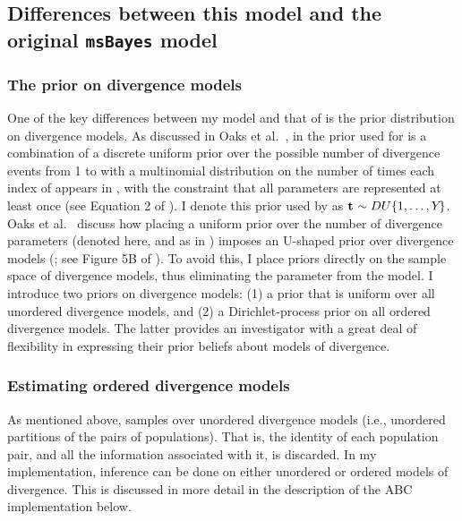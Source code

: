 \subsection{Differences between this model and the original \texttt{msBayes} model}
\subsubsection{The prior on divergence models}
One of the key differences between my model and that of \msb \cite{Huang2011}
is the prior distribution on divergence models.
As discussed in Oaks et al.\ \cite{Oaks2012}, in \msb the prior used for
\divTimeIndexVector is a combination of a discrete uniform prior over the
possible number of divergence events \divTimeNum from 1 to \npairs{} with a
multinomial distribution on the number of times each index of \divTimeVector
appears in \divTimeIndexVector, with the constraint that all \divTime{}
parameters are represented at least once (see Equation 2 of \cite{Oaks2012}).
I denote this prior used by \msb as $\mathbf{t_{}} \sim DU\{1, \ldots, Y_{}\}$.
Oaks et al.\ \cite{Oaks2012} discuss how placing a uniform prior over the
number of divergence parameters (denoted \divTimeNum here, and as \numt{} in
\cite{Huang2011}) imposes an U-shaped prior over divergence
models (\divTimeIndexVector; see
Figure 5B of \cite{Oaks2012}).
To avoid this, I place priors directly on the sample space of divergence
models, thus eliminating the parameter \numt{} from the model.
I introduce two priors on divergence models:
(1) a prior that is uniform over all unordered divergence models, and
(2) a Dirichlet-process prior on all ordered divergence models.
The latter provides an investigator with a great deal of flexibility in
expressing their prior beliefs about models of divergence.

\subsubsection{Estimating ordered divergence models}
As mentioned above, \msb samples over unordered divergence models
(i.e., unordered partitions of the \npairs{} pairs of populations).
That is, the identity of each population pair, and all the information
associated with it, is discarded.
In my implementation, inference can be done on either unordered or ordered
models of divergence.
This is discussed in more detail in the description of the ABC implementation
below.

